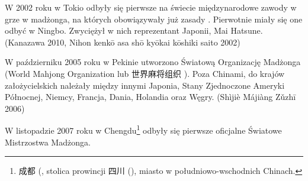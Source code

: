 W 2002 roku w Tokio odbyły się pierwsze na świecie międzynarodowe zawody w grze
w madżonga, na których obowiązywały już zasady .
Pierwotnie miały się one odbyć w Ningbo. Zwyciężył w nich reprezentant Japonii,
Mai Hatsune. (Kanazawa 2010, Nihon kenkō asa shō kyōkai kōshiki saito 2002)

W październiku 2005 roku w Pekinie utworzono Światową Organizację Madżonga
(World Mahjong Organization lub 世界麻将组织 ).
Poza Chinami, do krajów założycielskich należały między innymi Japonia, Stany
Zjednoczone Ameryki Północnej, Niemcy, Francja, Dania, Holandia oraz Węgry.
(Shìjiè Májiàng Zǔzhī 2006)

W listopadzie 2007 roku w Chengdu\footnote{成都 (, stolica
prowincji 四川 (), miasto w południowo-wschodnich Chinach.} odbyły
się pierwsze oficjalne Światowe Mistrzostwa Madżonga.






 














